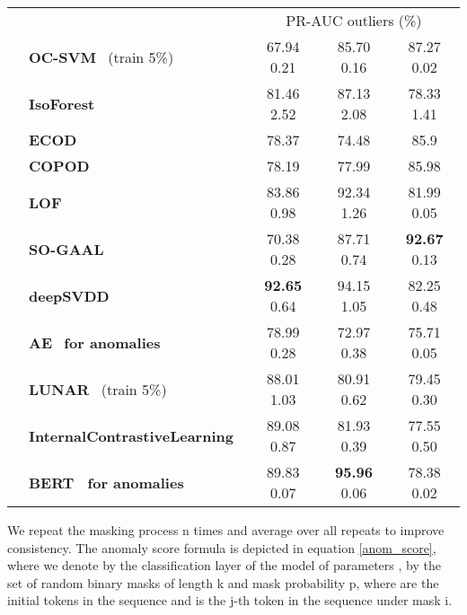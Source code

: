 \documentclass{article}
\begin{document}
\begin{table}[t]
\begin{center}
\begin{tabular}{c l c c c}
    
    && \multicolumn{3}{c}{PR-AUC outliers (\%) } \\
    \cmidrule(lr){3-5}
    \parbox[t]{2mm}{} &
    \textbf{OC-SVM}~\cite{ocsvm} (train 5\%)& 67.94	  \small 0.21 & 85.70	  \small 0.16 & 87.27  \small 0.02\\ 
    & \textbf{IsoForest}~\cite{isoforest} & 81.46  \small 2.52 & 87.13  \small 2.08 & 78.33  \small 1.41 \\
    & \textbf{ECOD}~\cite{ecod} & 78.37 & 74.48 & 85.9\\ 
    & \textbf{COPOD}~\cite{copod}& 78.19 & 77.99 & 85.98\\ 
    & \textbf{LOF}~\cite{lof} & 83.86  \small 0.98 & 92.34  \small 1.26 & 81.99  \small 0.05 \\ 
    \cmidrule(lr){2-5}
    \parbox[t]{2mm}{} 
    & \textbf{SO-GAAL}~\cite{mo_gaal} & 70.38  \small 0.28 & 87.71  \small 0.74 & \textbf{92.67}  \small 0.13\\ 
    & \textbf{deepSVDD}~\cite{deepsvdd} & \textbf{92.65}  \small 0.64 & 94.15  \small 1.05 & 82.25  \small 0.48 \\
& \textbf{AE}~\cite{autoencoder} \textbf{for anomalies} & 78.99  \small 0.28 & 72.97  \small 0.38 & 75.71  \small 0.05\\
    & \textbf{LUNAR}~\cite{lunar} (train 5\%) & 88.01  \small 1.03 & 80.91  \small 0.62 & 79.45  \small 0.30 \\ 
    & \textbf{InternalContrastiveLearning}~\cite{icl} & 89.08  \small 0.87 & 81.93  \small 0.39 & 77.55  \small 0.50\\ 
    & \textbf{BERT~\cite{bert} for anomalies} & 89.83  \small 0.07 & \textbf{95.96}  \small 0.06 & 78.38   \small 0.02\\ 
    \bottomrule
    \end{tabular}
       
    \label{aptab:far_near_roc_pr}
\end{center}
\end{table}
\endgroup





We repeat the masking process n times and average over all repeats to improve consistency. The anomaly score formula is depicted in equation \ref{anom_score}, where we denote by  the classification layer of the model of parameters , by  the set of random binary masks of length k and mask probability p, where  are the initial tokens in the sequence and  is the j-th token in the sequence under mask i.
\end{document}

